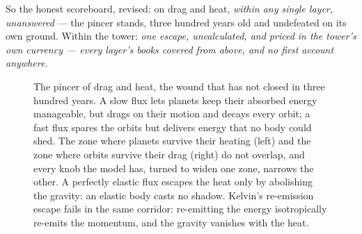 \documentclass[fontsize=11pt,paper=a4,pagesize=auto,parskip=half-]{scrbook}
\begin{document}
So the honest scoreboard, revised: on drag and heat, \emph{within any single layer, unanswered} --- the pincer stands, three hundred years old and undefeated on its own ground. Within the tower: \emph{one escape, uncalculated, and priced in the tower's own currency --- every layer's books covered from above, and no first account anywhere.}


\begin{figure}[htbp]
\centering
{}
\caption{The pincer of drag and heat, the wound that has not closed in three hundred years. A slow flux lets planets keep their absorbed energy manageable, but drags on their motion and decays every orbit; a fast flux spares the orbits but delivers energy that no body could shed. The zone where planets survive their heating (left) and the zone where orbits survive their drag (right) do not overlap, and every knob the model has, turned to widen one zone, narrows the other. A perfectly elastic flux escapes the heat only by abolishing the gravity: an elastic body casts no shadow. Kelvin's re-emission escape fails in the same corridor: re-emitting the energy isotropically re-emits the momentum, and the gravity vanishes with the heat.}
\label{fig:pincer}
\end{figure}
\end{document}
